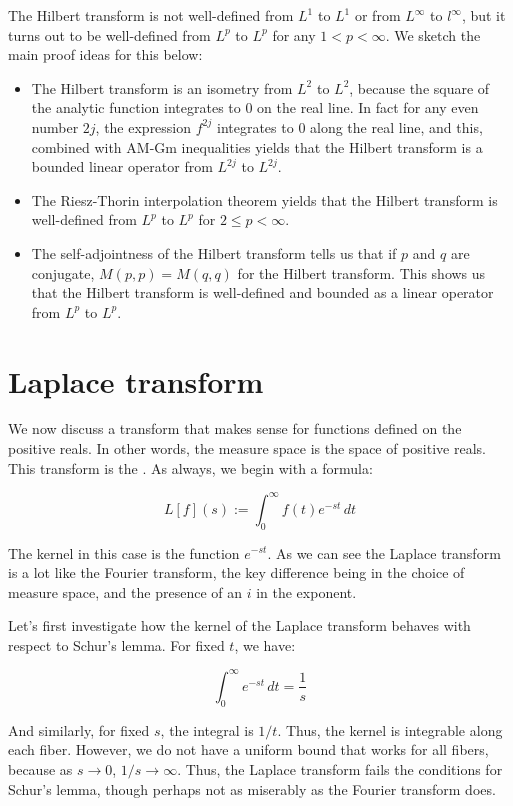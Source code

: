 \documentclass[a4paper]{amsart}
\begin{document}
The Hilbert transform is not well-defined from $L^1$ to $L^1$ or from
$L^\infty$ to $l^\infty$, but it turns out to be well-defined from
$L^p$ to $L^p$ for any $1 < p < \infty$. We sketch the main proof
ideas for this below:

\begin{itemize}

\item The Hilbert transform is an isometry from $L^2$ to $L^2$,
  because the square of the analytic function integrates to $0$ on the
  real line. In fact for any even number $2j$, the expression $f^{2j}$
  integrates to $0$ along the real line, and this, combined with AM-Gm
  inequalities yields that the Hilbert transform is a bounded linear
  operator from $L^{2j}$ to $L^{2j}$.

\item The Riesz-Thorin interpolation theorem yields that the Hilbert
  transform is well-defined from $L^p$ to $L^p$ for $2 \le p <
  \infty$.
\item The self-adjointness of the Hilbert transform tells us that if
  $p$ and $q$ are conjugate, $M(p,p) = M(q,q)$ for the Hilbert
  transform. This shows us that the Hilbert transform is well-defined
  and bounded as a linear operator from $L^p$ to $L^p$.

\end{itemize}

\section{Laplace transform}

We now discuss a transform that makes sense for functions defined on
the positive reals. In other words, the measure space is the space of
positive reals. This transform is the . As always, we begin with a formula:

$$L[f](s) := \int_0^\infty f(t) e^{-st} \, dt$$

The kernel in this case is the function $e^{-st}$. As we can see the
Laplace transform is a lot like the Fourier transform, the key
difference being in the choice of measure space, and the presence of
an $i$ in the exponent.

Let's first investigate how the kernel of the Laplace transform
behaves with respect to Schur's lemma. For fixed $t$, we have:

$$\int_0^\infty e^{-st} \, dt = \frac{1}{s}$$

And similarly, for fixed $s$, the integral is $1/t$. Thus, the kernel
is integrable along each fiber. However, we do not have a uniform
bound that works for all fibers, because as $s \to 0$, $1/s \to
\infty$. Thus, the Laplace transform fails the conditions for Schur's
lemma, though perhaps not as miserably as the Fourier transform does.
\end{document}
